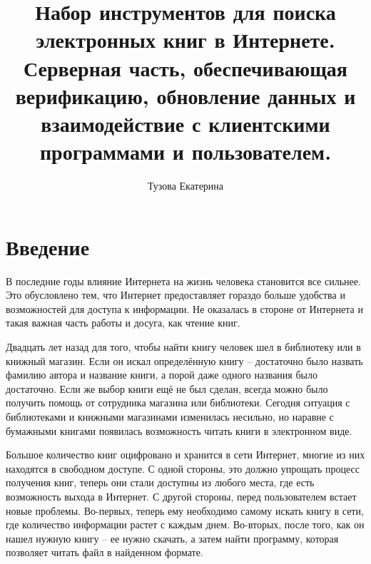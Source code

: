 \documentclass[a4paper]{report}
\begin{document}
\author{Тузова Екатерина}
\title{Набор инструментов для поиска электронных книг в Интернете. Серверная часть, обеспечивающая верификацию, обновление данных и взаимодействие с клиентскими программами и пользователем.}

\maketitle


\newpage
\tableofcontents
\newpage

\section{Введение}
В последние годы влияние Интернета на жизнь человека становится все сильнее. Это обусловлено тем, что Интернет предоставляет гораздо больше удобства и возможностей для доступа к информации. Не оказалась в стороне от Интернета и такая важная часть работы и досуга, как чтение книг.

Двадцать лет назад для того, чтобы найти книгу человек шел в библиотеку или в книжный магазин. Если он искал определённую книгу -- достаточно было назвать фамилию автора и название книги, а порой даже одного названия было достаточно. Если же выбор книги ещё не был сделан, всегда можно было получить помощь от сотрудника магазина или библиотеки. Сегодня ситуация с библиотеками и книжными магазинами изменилась несильно, но наравне с бумажными книгами появилась возможность читать книги в электронном виде. 

Большое количество книг оцифровано и хранится в сети Интернет, многие из них находятся в свободном доступе. С одной стороны, это должно упрощать процесс получения книг, \tk теперь они стали доступны из любого места, где есть возможность выхода в Интернет. С другой стороны, перед пользователем встает новые проблемы. Во-первых, теперь ему необходимо самому искать книгу в сети, где количество информации растет с каждым днем. Во-вторых, после того, как он нашел нужную книгу -- ее нужно скачать, а затем найти программу, которая позволяет читать файл в найденном формате. 
\end{document}

